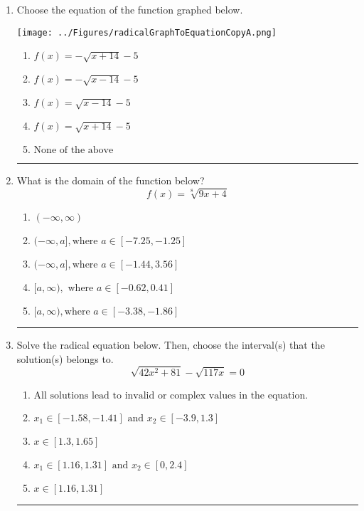 \documentclass[14pt]{extbook}
\newcommand{\litem}[1]{\item#1\hspace*{-1cm}\rule{\textwidth}{0.4pt}}
\begin{document}
\begin{enumerate}
\litem{
Choose the equation of the function graphed below.
\begin{center}
    \texttt{[image: ../Figures/radicalGraphToEquationCopyA.png]}
\end{center}
\begin{enumerate}[label=\Alph*.]
\item \( f(x) = - \sqrt{x + 14} - 5 \)
\item \( f(x) = - \sqrt{x - 14} - 5 \)
\item \( f(x) = \sqrt{x - 14} - 5 \)
\item \( f(x) = \sqrt{x + 14} - 5 \)
\item \( \text{None of the above} \)

\end{enumerate} }
\litem{
What is the domain of the function below?\[ f(x) = \sqrt[8]{9 x + 4} \]\begin{enumerate}[label=\Alph*.]
\item \( (-\infty, \infty) \)
\item \( (-\infty, a], \text{where } a \in [-7.25, -1.25] \)
\item \( (-\infty, a], \text{where } a \in [-1.44, 3.56] \)
\item \( [a, \infty), \text{ where } a \in [-0.62, 0.41] \)
\item \( [a, \infty), \text{where } a \in [-3.38, -1.86] \)

\end{enumerate} }
\litem{
Solve the radical equation below. Then, choose the interval(s) that the solution(s) belongs to.\[ \sqrt{42 x^2 + 81} - \sqrt{117 x} = 0 \]\begin{enumerate}[label=\Alph*.]
\item \( \text{All solutions lead to invalid or complex values in the equation.} \)
\item \( x_1 \in [-1.58, -1.41] \text{ and } x_2 \in [-3.9,1.3] \)
\item \( x \in [1.3,1.65] \)
\item \( x_1 \in [1.16, 1.31] \text{ and } x_2 \in [0,2.4] \)
\item \( x \in [1.16,1.31] \)


\end{enumerate}}
\end{enumerate}
\end{document}
